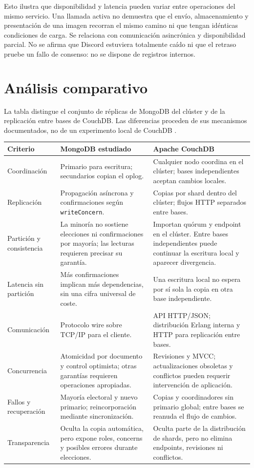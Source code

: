 Esto ilustra que disponibilidad y latencia pueden variar entre operaciones del mismo servicio. Una llamada activa no demuestra que el envío, almacenamiento y presentación de una imagen recorran el mismo camino ni que tengan idénticas condiciones de carga. Se relaciona con comunicación asincrónica y disponibilidad parcial. No se afirma que Discord estuviera totalmente caído ni que el retraso pruebe un fallo de consenso: no se dispone de registros internos.

\section{Análisis comparativo}\label{sec:comparacion}
La tabla distingue el conjunto de réplicas de MongoDB del clúster y de la replicación entre bases de CouchDB. Las diferencias proceden de sus mecanismos documentados, no de un experimento local de CouchDB \cite{MongoReplication,MongoWriteConcern,CouchShards,CouchReplication,CouchConflicts}.

\begin{longtable}{p{.18\linewidth}p{.35\linewidth}p{.35\linewidth}}
\toprule
\textbf{Criterio} & \textbf{MongoDB estudiado} & \textbf{Apache CouchDB} \\
\midrule
\endhead
Coordinación & Primario para escritura; secundarios copian el oplog. & Cualquier nodo coordina en el clúster; bases independientes aceptan cambios locales. \\
Replicación & Propagación asíncrona y confirmaciones según \texttt{writeConcern}. & Copias por shard dentro del clúster; flujos HTTP separados entre bases. \\
Partición y consistencia & La minoría no sostiene elecciones ni confirmaciones por mayoría; las lecturas requieren precisar su garantía. & Importan quórum y endpoint en el clúster. Entre bases independientes puede continuar la escritura local y aparecer divergencia. \\
Latencia sin partición & Más confirmaciones implican más dependencias, sin una cifra universal de coste. & Una escritura local no espera por sí sola la copia en otra base independiente. \\
Comunicación & Protocolo wire sobre TCP/IP para el cliente. & API HTTP/JSON; distribución Erlang interna y HTTP para replicación entre bases. \\
Concurrencia & Atomicidad por documento y control optimista; otras garantías requieren operaciones apropiadas. & Revisiones y MVCC; actualizaciones obsoletas y conflictos pueden requerir intervención de aplicación. \\
Fallos y recuperación & Mayoría electoral y nuevo primario; reincorporación mediante sincronización. & Copias y coordinadores sin primario global; entre bases se reanuda el flujo de cambios. \\
Transparencia & Oculta la copia automática, pero expone roles, concerns y posibles errores durante elecciones. & Oculta parte de la distribución de shards, pero no elimina endpoints, revisiones ni conflictos. \\
\bottomrule
\end{longtable}

